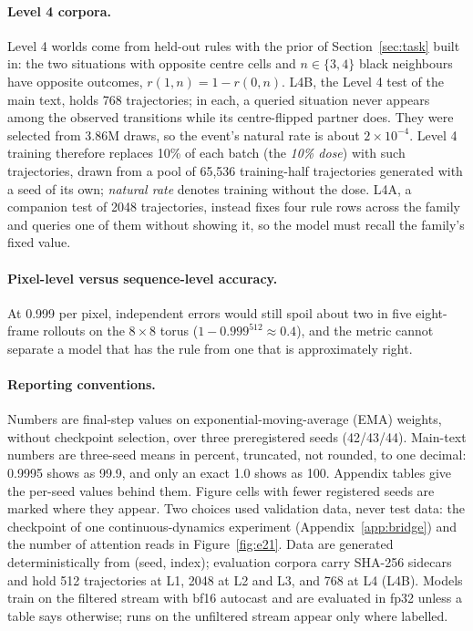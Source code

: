 \documentclass[11pt]{article}
\begin{document}
\paragraph{Level 4 corpora.}
Level 4 worlds come from held-out rules with the prior of Section~\ref{sec:task} built in: the two situations with opposite centre cells and $n\in\{3,4\}$ black neighbours have opposite outcomes, $r(1,n)=1-r(0,n)$. L4B, the Level 4 test of the main text, holds 768 trajectories; in each, a queried situation never appears among the observed transitions while its centre-flipped partner does. They were selected from 3.86M draws, so the event's natural rate is about $2\times10^{-4}$. Level 4 training therefore replaces 10\% of each batch (the \emph{10\% dose}) with such trajectories, drawn from a pool of 65{,}536 training-half trajectories generated with a seed of its own; \emph{natural rate} denotes training without the dose. L4A, a companion test of 2048 trajectories, instead fixes four rule rows across the family and queries one of them without showing it, so the model must recall the family's fixed value.

\paragraph{Pixel-level versus sequence-level accuracy.}
At 0.999 per pixel, independent errors would still spoil about two in five eight-frame rollouts on the $8\times8$ torus ($1-0.999^{512}\approx0.4$), and the metric cannot separate a model that has the rule from one that is approximately right.

\paragraph{Reporting conventions.}
Numbers are final-step values on exponential-moving-average (EMA) weights, without checkpoint selection, over three preregistered seeds (42/43/44). Main-text numbers are three-seed means in percent, truncated, not rounded, to one decimal: 0.9995 shows as 99.9, and only an exact 1.0 shows as 100. Appendix tables give the per-seed values behind them. Figure cells with fewer registered seeds are marked where they appear. Two choices used validation data, never test data: the checkpoint of one continuous-dynamics experiment (Appendix~\ref{app:bridge}) and the number of attention reads in Figure~\ref{fig:e21}. Data are generated deterministically from (seed, index); evaluation corpora carry SHA-256 sidecars and hold 512 trajectories at L1, 2048 at L2 and L3, and 768 at L4 (L4B). Models train on the filtered stream with bf16 autocast and are evaluated in fp32 unless a table says otherwise; runs on the unfiltered stream appear only where labelled.
\end{document}
